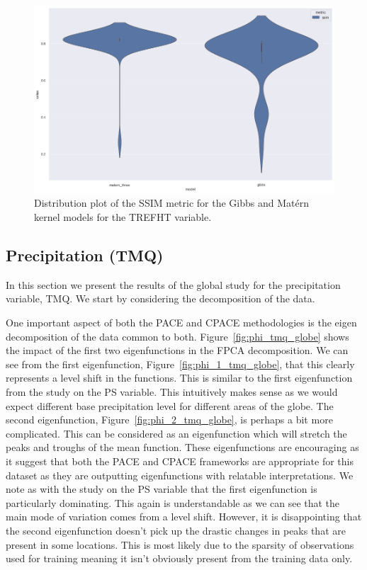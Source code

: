 \begin{figure}
	\centering
	\includegraphics[width=\textwidth]{cesm_trefht_dist}
	\caption{Distribution plot of the SSIM metric for the Gibbs and Mat\'ern kernel models for the TREFHT variable.}
	\label{fig:cesm_trefht_dist}
\end{figure}

\subsection{Precipitation (TMQ) \label{ssec:cesm_tmq}}
In this section we present the results of the global study for the precipitation variable, TMQ.
We start by considering the decomposition of the data. 

One important aspect of both the PACE and CPACE methodologies is the eigen decomposition of the data common to both. 
Figure~\ref{fig:phi_tmq_globe} shows the impact of the first two eigenfunctions in the FPCA decomposition.
We can see from the first eigenfunction, Figure~\ref{fig:phi_1_tmq_globe}, that this clearly represents a level shift in the functions.
This is similar to the first eigenfunction from the study on the PS variable.
This intuitively makes sense as we would expect different base precipitation level for different areas of the globe.
The second eigenfunction, Figure~\ref{fig:phi_2_tmq_globe}, is perhaps a bit more complicated.
This can be considered as an eigenfunction which will stretch the peaks and troughs of the mean function.
These eigenfunctions are encouraging as it suggest that both the PACE and CPACE frameworks are appropriate for this dataset as they are outputting eigenfunctions with relatable interpretations.
We note as with the study on the PS variable that the first eigenfunction is particularly dominating.
This again is understandable as we can see that the main mode of variation comes from a level shift.
However, it is disappointing that the second eigenfunction doesn't pick up the drastic changes in peaks that are present in some locations. 
This is most likely due to the sparsity of observations used for training meaning it isn't obviously present from the training data only.


